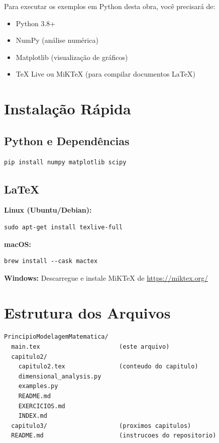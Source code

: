 \documentclass[12pt,a4paper,oneside]{book}
\begin{document}
Para executar os exemplos em Python desta obra, você precisará de:

\begin{itemize}
    \item Python 3.8+
    \item NumPy (análise numérica)
    \item Matplotlib (visualização de gráficos)
    \item TeX Live ou MiKTeX (para compilar documentos LaTeX)
\end{itemize}

\section{Instalação Rápida}

\subsection{Python e Dependências}

\begin{verbatim}
pip install numpy matplotlib scipy
\end{verbatim}

\subsection{LaTeX}

\textbf{Linux (Ubuntu/Debian):}
\begin{verbatim}
sudo apt-get install texlive-full
\end{verbatim}

\textbf{macOS:}
\begin{verbatim}
brew install --cask mactex
\end{verbatim}

\textbf{Windows:}
Descarregue e instale MiKTeX de \url{https://miktex.org/}

\section{Estrutura dos Arquivos}

\begin{verbatim}
PrincipioModelagemMatematica/
  main.tex                      (este arquivo)
  capitulo2/
    capitulo2.tex               (conteudo do capitulo)
    dimensional_analysis.py
    examples.py
    README.md
    EXERCICIOS.md
    INDEX.md
  capitulo3/                    (proximos capitulos)
  README.md                     (instrucoes do repositorio)
\end{verbatim}
\end{document}

